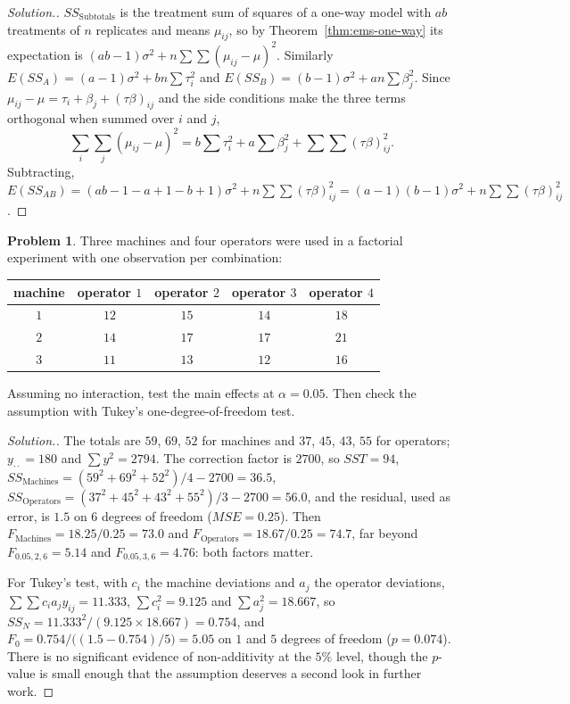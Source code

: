 \documentclass[11pt,a4paper]{article}
\numberwithin{equation}{section}
\theoremstyle{definition}
\newtheorem{problemx}{Problem}[subsection]
\newenvironment{problem}{\begin{problemx}}{\end{problemx}}
\newenvironment{solution}
  {\renewcommand{\qedsymbol}{}\begin{proof}[\textit{Solution}.]}
  {\end{proof}}
\begin{document}
\begin{solution}
$SS_{\mathrm{Subtotals}}$ is the treatment sum of squares of a one-way model with $ab$ treatments of $n$ replicates and means $\mu_{ij}$, so by
Theorem~\ref{thm:ems-one-way} its expectation is $(ab - 1)\sigma^2 + n\sum\sum(\mu_{ij} - \mu)^2$. Similarly $E(SS_A) = (a - 1)\sigma^2 + bn\sum\tau_i^2$ and $E(SS_B) = (b - 1)\sigma^2 + an\sum\beta_j^2$.
Since $\mu_{ij} - \mu = \tau_i + \beta_j + (\tau\beta)_{ij}$ and the side conditions make the three terms orthogonal when summed over $i$ and $j$,
\[
\sum_i\sum_j(\mu_{ij} - \mu)^2 = b\sum\tau_i^2 + a\sum\beta_j^2 + \sum\sum(\tau\beta)_{ij}^2 .
\]
Subtracting, $E(SS_{AB}) = (ab - 1 - a + 1 - b + 1)\sigma^2 + n\sum\sum(\tau\beta)_{ij}^2 = (a - 1)(b - 1)\sigma^2 + n\sum\sum(\tau\beta)_{ij}^2$.
\end{solution}

\begin{problem}
Three machines and four operators were used in a factorial experiment with one observation per combination:
\begin{center}
\begin{tabular}{c|cccc}
machine & operator $1$ & operator $2$ & operator $3$ & operator $4$ \\
\hline
$1$ & $12$ & $15$ & $14$ & $18$ \\
$2$ & $14$ & $17$ & $17$ & $21$ \\
$3$ & $11$ & $13$ & $12$ & $16$
\end{tabular}
\end{center}
Assuming no interaction, test the main effects at $\alpha = 0.05$. Then check the assumption with Tukey's one-degree-of-freedom test.
\end{problem}

\begin{solution}
The totals are $59$, $69$, $52$ for machines and $37$, $45$, $43$, $55$ for operators; $y_{\cdot\cdot} = 180$ and $\sum y^2 = 2794$. The correction factor is $2700$, so $SST = 94$,
$SS_{\mathrm{Machines}} = (59^2 + 69^2 + 52^2)/4 - 2700 = 36.5$, $SS_{\mathrm{Operators}} = (37^2 + 45^2 + 43^2 + 55^2)/3 - 2700 = 56.0$, and the residual, used as error, is $1.5$ on $6$
degrees of freedom ($MSE = 0.25$). Then $F_{\mathrm{Machines}} = 18.25/0.25 = 73.0$ and $F_{\mathrm{Operators}} = 18.67/0.25 = 74.7$, far beyond $F_{0.05,2,6} = 5.14$ and $F_{0.05,3,6} = 4.76$: both
factors matter.

For Tukey's test, with $c_i$ the machine deviations and $a_j$ the operator deviations, $\sum\sum c_ia_jy_{ij} = 11.333$, $\sum c_i^2 = 9.125$ and $\sum a_j^2 = 18.667$, so
$SS_N = 11.333^2/(9.125 \times 18.667) = 0.754$, and $F_0 = 0.754/\bigl((1.5 - 0.754)/5\bigr) = 5.05$ on $1$ and $5$ degrees of freedom ($p = 0.074$). There is no significant evidence
of non-additivity at the $5\%$ level, though the $p$-value is small enough that the assumption deserves a second look in further work.
\end{solution}
\end{document}
